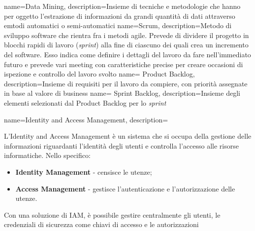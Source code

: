 {
  name=Data Mining,
  description={Insieme di tecniche e metodologie che hanno per oggetto l'estrazione di informazioni da grandi quantità di dati attraverso
  emtodi automatici o semi-automatici}
}
{
	name=Scrum,
	description={Metodo di sviluppo software che rientra fra i metodi agile. Prevede di dividere il progetto in blocchi rapidi di lavoro (\textit{sprint}) alla fine di ciascuno dei quali crea un incremento del software. Esso indica come definire i dettagli del lavoro da fare nell'immediato futuro e prevede vari meeting con caratteristiche precise per creare occasioni di ispezione e controllo del lavoro svolto \cite{scrum}
	}
}
{
	name= Product Backlog,
	description={Insieme di requisiti per il lavoro da compiere, con priorità assegnate in base al valore di business}
}
{
	name= Sprint Backlog,
	description={Insieme degli elementi selezionati dal Product Backlog per lo \textit{sprint}}
}
{
	name=Identity and Access Management,
	description={L'Identity and Access Management è un sistema che si occupa della gestione delle informazioni riguardanti l'identità degli utenti e controlla l'accesso alle risorse informatiche. Nello specifico:
	\begin{itemize}
		\item \textbf{Identity Management} - censisce le utenze;
		\item \textbf{Access Management} - gestisce l'autenticazione e l'autorizzazione delle utenze. 
	\end{itemize}
	Con una soluzione di IAM, è possibile gestire centralmente gli utenti, le credenziali di sicurezza come chiavi di accesso e le autorizzazioni}
}

